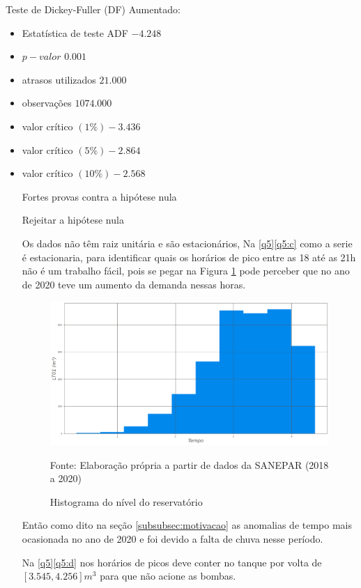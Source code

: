 Teste de Dickey-Fuller (DF) Aumentado: 
\begin{itemize}
	\item Estatística de teste ADF     $-4.248$
\item $p-valor$                       $0.001$
\item atrasos utilizados         $21.000$
\item  observações              $1074.000$
\item valor crítico $(1\%)           -3.436$
\item valor crítico $(5\%)           -2.864$
\item valor crítico $(10\%)          -2.568$


Fortes provas contra a hipótese nula

Rejeitar a hipótese nula

Os dados não têm raiz unitária e são estacionários, Na \ref{q5}\ref{q5:c} como a serie é estacionaria, para identificar quais os horários de pico entre as 18 até as 21h não é um trabalho fácil, pois se pegar na Figura \ref{fig:hist} pode perceber que no ano de 2020 teve um aumento da demanda nessas horas.

\begin{figure}[H]
	\centering
	\caption{Histograma do nível do reservatório}
	\label{fig:hist}
	\includegraphics[width=1\linewidth]{Resultados/Figuras/hist}
	
	Fonte: Elaboração própria a partir de dados da SANEPAR (2018 a 2020)
\end{figure}

Então como dito na seção \ref{subsubsec:motivacao} as anomalias de tempo mais ocasionada no ano de 2020 e foi devido a falta de chuva nesse período.

Na \ref{q5}\ref{q5:d} nos horários de picos deve conter no tanque por volta de $[3.545,4.256] m^3$ para que não acione as bombas.


\end{itemize}
